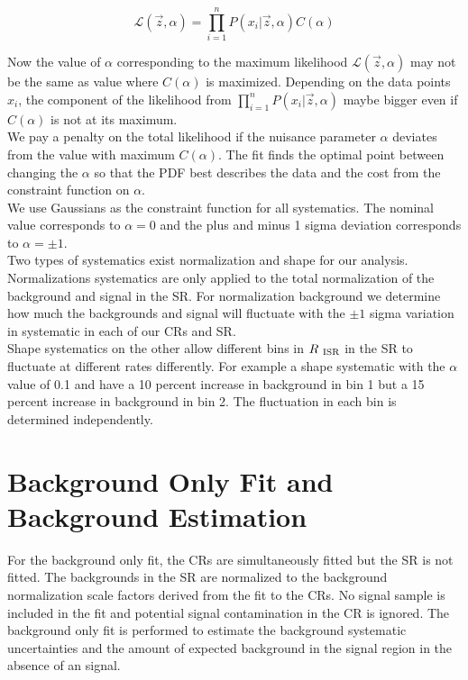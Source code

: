 \begin{equation}
\label{eqn:stat:sys}
{\mathcal{L}}(\vec{z},\alpha) = {\displaystyle\prod_{i=1}^{n}} P(x_i|\vec{z},\alpha) C(\alpha)
\end{equation}

\indent Now the value of $\alpha$ corresponding to the maximum likelihood ${\mathcal{L}}(\vec{z},\alpha)$ may not be the same as value where $C(\alpha)$ is maximized.  Depending on the data points $x_i$, the component of the likelihood from ${\displaystyle\prod_{i=1}^{n}} P(x_i|\vec{z},\alpha)$ maybe bigger even if $C(\alpha)$ is not at its maximum. \\

\indent We pay a penalty on the total likelihood if the nuisance parameter $\alpha$ deviates from the value with maximum $C(\alpha)$.  The fit finds the optimal point between changing the $\alpha$ so that the PDF best describes the data and the cost from the constraint function on $\alpha$. \\

\indent We use Gaussians as the constraint function for all systematics.  The nominal value corresponds to $\alpha = 0$ and the plus and minus 1 sigma deviation corresponds to $\alpha = \pm1$.  \\

\indent Two types of systematics exist normalization and shape for our analysis.  Normalizations systematics are only applied to the total normalization of the background and signal in the SR.  For normalization background we determine how much the backgrounds and signal will fluctuate with the $\pm1$ sigma variation in systematic in each of our CRs and SR.  \\

\indent Shape systematics on the other allow different bins in $R_{~\mathrm{ISR}}$ in the SR to fluctuate at different rates differently.  For example a shape systematic with the $\alpha$ value of 0.1 and have a 10 percent increase in background in bin 1 but a 15 percent increase in background in bin 2.  The fluctuation in each bin is determined independently.  \\

\section{Background Only Fit and Background Estimation}
\label{sec:stat:bkgonly}

\indent For the background only fit, the CRs are simultaneously fitted but the SR is not fitted.  The backgrounds in the SR are normalized to the background normalization scale factors derived from the fit to the CRs.  No signal sample is included in the fit and potential signal contamination in the CR is ignored.  The background only fit is performed to estimate the background systematic uncertainties and the amount of expected background in the signal region in the absence of an signal.  \\

